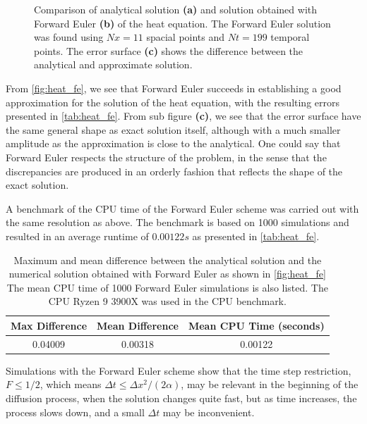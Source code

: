 \begin{figure}[H]
\caption{Comparison of analytical solution \textbf{(a)} and solution obtained with Forward Euler \textbf{(b)} of the heat equation. The Forward Euler solution was found using $Nx = 11$ spacial points and $Nt = 199$ temporal points. The error surface \textbf{(c)} shows the difference between the analytical and approximate solution.}
\label{fig:heat_fe}
\end{figure}

From \autoref{fig:heat_fe}, we see that Forward Euler succeeds in establishing a good approximation for the solution of the heat equation, with the resulting errors presented in \autoref{tab:heat_fe}. From sub figure \textbf{(c)}, we see that the error surface have the same general shape as exact solution itself, although with a much smaller amplitude as the approximation is close to the analytical. One could say that Forward Euler respects the structure of the problem, in the sense that the discrepancies are produced in an orderly fashion that reflects the shape of the exact solution.

A benchmark of the CPU time of the Forward Euler scheme was carried out with the same resolution as above. The benchmark is based on 1000 simulations and resulted in an average runtime of $0.00122s$ as presented in \autoref{tab:heat_fe}.

\begin{table}[H]
\caption{Maximum and mean difference between the analytical solution and the numerical solution obtained with Forward Euler as shown in \autoref{fig:heat_fe}  
The mean CPU time of 1000 Forward Euler simulations is also listed. The CPU Ryzen 9 3900X was used in the CPU benchmark.}
\centering
{}
\begin{tabular}{ccc}
\hline
\hline 
Max Difference & Mean Difference & Mean CPU Time (seconds)
\\
\hline 
\hline 
0.04009 & 0.00318 & 0.00122
\\
\hline
\hline
\end{tabular}
\label{tab:heat_fe}
\end{table}



Simulations with the Forward Euler scheme show that the time step restriction, $F \leq 1/2$, which means $\Delta t \leq \Delta x^2 / (2\alpha)$, may be relevant in the beginning of the diffusion process, when the solution changes quite fast, but as time increases, the process slows down, and a small $\Delta t$ may be inconvenient.

